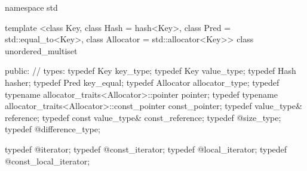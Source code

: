 %
\begin{codeblock}
namespace std {
  template <class Key,
            class Hash = hash<Key>,
            class Pred = std::equal_to<Key>,
            class Allocator = std::allocator<Key>>
  class unordered_multiset {
  public:
    // types:
    typedef Key                                                 key_type;
    typedef Key                                                 value_type;
    typedef Hash                                                hasher;
    typedef Pred                                                key_equal;
    typedef Allocator                                           allocator_type;
    typedef typename allocator_traits<Allocator>::pointer       pointer;
    typedef typename allocator_traits<Allocator>::const_pointer const_pointer;
    typedef value_type&                                         reference;
    typedef const value_type&                                   const_reference;
    typedef @\impdefnc@                              size_type;
    typedef @\impdefnc@                              difference_type;

    typedef @\impdefnc@                              iterator;
    typedef @\impdefnc@                              const_iterator;
    typedef @\impdefnc@                              local_iterator;
    typedef @\impdefnc@                              const_local_iterator;

}}
\end{codeblock}
